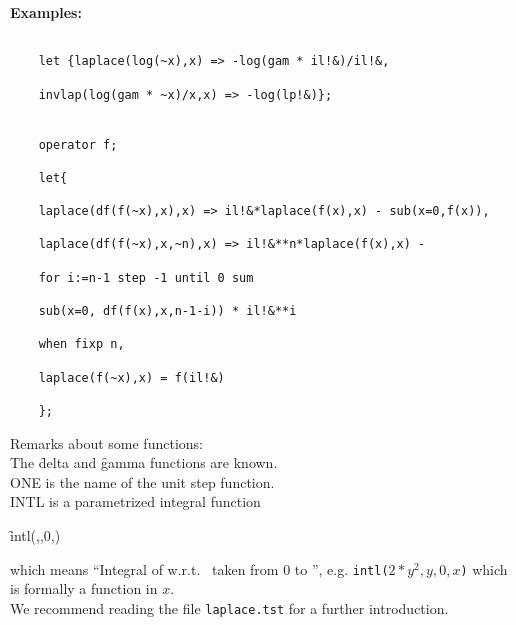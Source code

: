 \pagebreak
\textbf{Examples:}
\begin{verbatim}

    let {laplace(log(~x),x) => -log(gam * il!&)/il!&,

    invlap(log(gam * ~x)/x,x) => -log(lp!&)};


    operator f;

    let{

    laplace(df(f(~x),x),x) => il!&*laplace(f(x),x) - sub(x=0,f(x)),

    laplace(df(f(~x),x,~n),x) => il!&**n*laplace(f(x),x) -

    for i:=n-1 step -1 until 0 sum

    sub(x=0, df(f(x),x,n-1-i)) * il!&**i

    when fixp n,

    laplace(f(~x),x) = f(il!&)

    };

\end{verbatim}


Remarks about some functions: \\[\baselineskip]
The \f{delta} and \f{gamma} functions are known. \\
ONE is the name of the unit step function. \\
INTL is a parametrized integral function
\begin{syntax}
\f{intl}(,,0,)
\end{syntax}
which means ``Integral of  w.r.t.~ taken from 0 to '',
e.g. \texttt{intl($2{*}y^2,y,0,x$)} which is formally a function in $x$.\\
We recommend reading the file \texttt{laplace.tst} for a further introduction.
